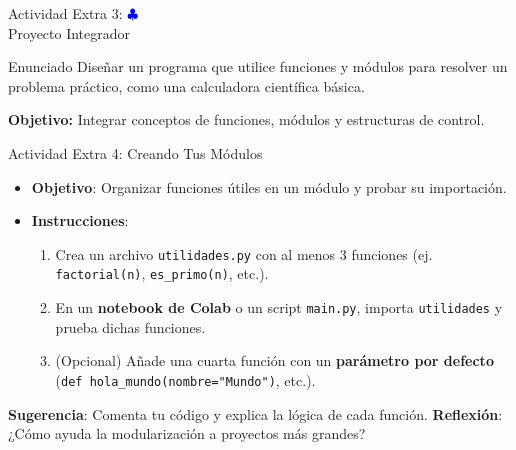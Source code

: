 \documentclass[10pt]{beamer}
\begin{document}
\begin{frame}{Actividad Extra 3: \hfill \textcolor{blue}{$\clubsuit$} \\
Proyecto Integrador}
  \begin{block}{Enunciado}
    Diseñar un programa que utilice funciones y módulos para resolver un problema práctico, como una calculadora científica básica.
  \end{block}
  \textbf{Objetivo:} Integrar conceptos de funciones, módulos y estructuras de control.
\end{frame}

\begin{frame}{Actividad Extra 4: Creando Tus Módulos}
  \begin{itemize}
    \item \textbf{Objetivo}: Organizar funciones útiles en un módulo y probar su importación.
    \item \textbf{Instrucciones}:
      \begin{enumerate}
        \item Crea un archivo \texttt{utilidades.py} con al menos 3 funciones (ej. \texttt{factorial(n)}, \texttt{es\_primo(n)}, etc.).
        \item En un \textbf{notebook de Colab} o un script \texttt{main.py}, importa \texttt{utilidades} y prueba dichas funciones.
        \item (Opcional) Añade una cuarta función con un \textbf{parámetro por defecto} (\texttt{def hola\_mundo(nombre="Mundo")}, etc.).
      \end{enumerate}
  \end{itemize}
  \textbf{Sugerencia}: Comenta tu código y explica la lógica de cada función.
  \textbf{Reflexión}: ¿Cómo ayuda la modularización a proyectos más grandes?
\end{frame}
\end{document}
